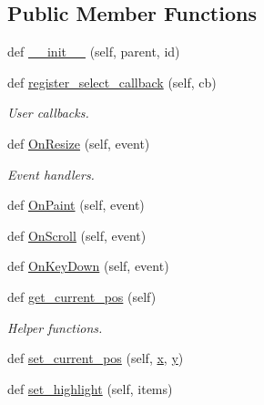 \subsection*{Public Member Functions}
\begin{DoxyCompactItemize}
\item 
def \hyperlink{classsmacc__viewer_1_1xdot_1_1wxxdot_1_1WxDotWindow_a18e80b7ca82c447e9698f24ea57038dd}{\+\_\+\+\_\+init\+\_\+\+\_\+} (self, parent, id)
\item 
def \hyperlink{classsmacc__viewer_1_1xdot_1_1wxxdot_1_1WxDotWindow_a91fe5a584f1c9ab66dfc9fb08918b409}{register\+\_\+select\+\_\+callback} (self, cb)
\begin{DoxyCompactList}\small\item\em User callbacks. \end{DoxyCompactList}\item 
def \hyperlink{classsmacc__viewer_1_1xdot_1_1wxxdot_1_1WxDotWindow_aa6be4dbd983baab673b1ff4241f3b224}{On\+Resize} (self, event)
\begin{DoxyCompactList}\small\item\em Event handlers. \end{DoxyCompactList}\item 
def \hyperlink{classsmacc__viewer_1_1xdot_1_1wxxdot_1_1WxDotWindow_aecd841485913fca786779841be629ab1}{On\+Paint} (self, event)
\item 
def \hyperlink{classsmacc__viewer_1_1xdot_1_1wxxdot_1_1WxDotWindow_a72a8503323f31f0bc321cafcd23f3318}{On\+Scroll} (self, event)
\item 
def \hyperlink{classsmacc__viewer_1_1xdot_1_1wxxdot_1_1WxDotWindow_af355430a6c37ee9bec65fdde2e3f1249}{On\+Key\+Down} (self, event)
\item 
def \hyperlink{classsmacc__viewer_1_1xdot_1_1wxxdot_1_1WxDotWindow_a1ff3b6525fdf714bb20de2f68729ac02}{get\+\_\+current\+\_\+pos} (self)
\begin{DoxyCompactList}\small\item\em Helper functions. \end{DoxyCompactList}\item 
def \hyperlink{classsmacc__viewer_1_1xdot_1_1wxxdot_1_1WxDotWindow_a9031a772dfc3d666a18eedc881d37d2a}{set\+\_\+current\+\_\+pos} (self, \hyperlink{classsmacc__viewer_1_1xdot_1_1wxxdot_1_1WxDotWindow_af93c06ad884159a0fcfba52dcbc0ac54}{x}, \hyperlink{classsmacc__viewer_1_1xdot_1_1wxxdot_1_1WxDotWindow_add4a798dbd2255643a4dadf0e7cc417c}{y})
\item 
def \hyperlink{classsmacc__viewer_1_1xdot_1_1wxxdot_1_1WxDotWindow_a78d15f9d5b16b6d983a2ad7050523527}{set\+\_\+highlight} (self, items)

\end{DoxyCompactItemize}
